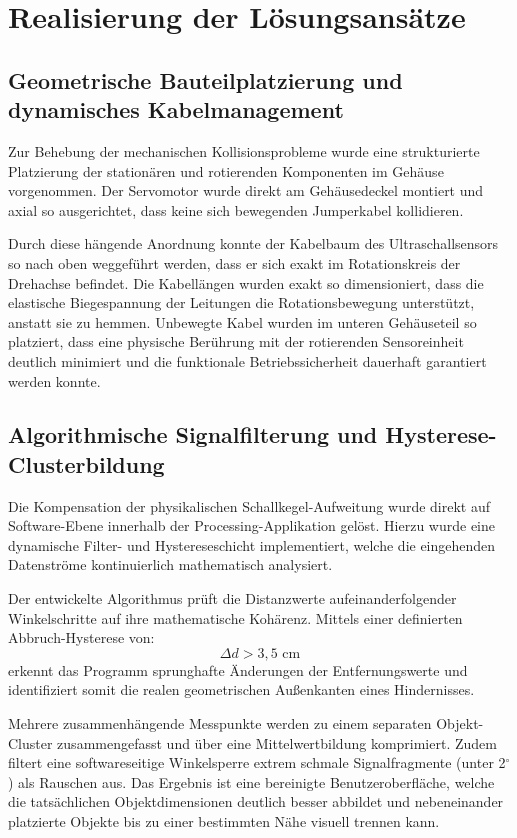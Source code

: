 \section{Realisierung der Lösungsansätze}
\label{sec:Loesung_Herausforderungen}

\subsection{Geometrische Bauteilplatzierung und dynamisches Kabelmanagement}
Zur Behebung der mechanischen Kollisionsprobleme wurde eine strukturierte Platzierung der stationären und rotierenden Komponenten im Gehäuse vorgenommen. Der Servomotor wurde direkt am Gehäusedeckel montiert und axial so ausgerichtet, dass keine sich bewegenden Jumperkabel kollidieren. 

Durch diese hängende Anordnung konnte der Kabelbaum des Ultraschallsensors so nach oben weggeführt werden, dass er sich exakt im Rotationskreis der Drehachse befindet. Die Kabellängen wurden exakt so dimensioniert, dass die elastische Biegespannung der Leitungen die Rotationsbewegung unterstützt, anstatt sie zu hemmen. Unbewegte Kabel wurden im unteren Gehäuseteil so platziert, dass eine physische Berührung mit der rotierenden Sensoreinheit deutlich minimiert und die funktionale Betriebssicherheit dauerhaft garantiert werden konnte.

\subsection{Algorithmische Signalfilterung und Hysterese-Clusterbildung}
Die Kompensation der physikalischen Schallkegel-Aufweitung wurde direkt auf Software-Ebene innerhalb der Processing-Applikation gelöst. Hierzu wurde eine dynamische Filter- und Hystereseschicht implementiert, welche die eingehenden Datenströme kontinuierlich mathematisch analysiert.

Der entwickelte Algorithmus prüft die Distanzwerte aufeinanderfolgender Winkelschritte auf ihre mathematische Kohärenz. Mittels einer definierten Abbruch-Hysterese von:
\begin{equation}
	\Delta d > 3{,}5\text{ cm}
\end{equation}
erkennt das Programm sprunghafte Änderungen der Entfernungswerte und identifiziert somit die realen geometrischen Au\ss enkanten eines Hindernisses. 

Mehrere zusammenhängende Messpunkte werden zu einem separaten Objekt-Cluster zusammengefasst und über eine Mittelwertbildung komprimiert. Zudem filtert eine softwareseitige Winkelsperre extrem schmale Signalfragmente (unter 2$^\circ$) als Rauschen aus. Das Ergebnis ist eine bereinigte Benutzeroberfläche, welche die tatsächlichen Objektdimensionen deutlich besser abbildet und  nebeneinander platzierte Objekte bis zu einer bestimmten Nähe visuell trennen kann.


